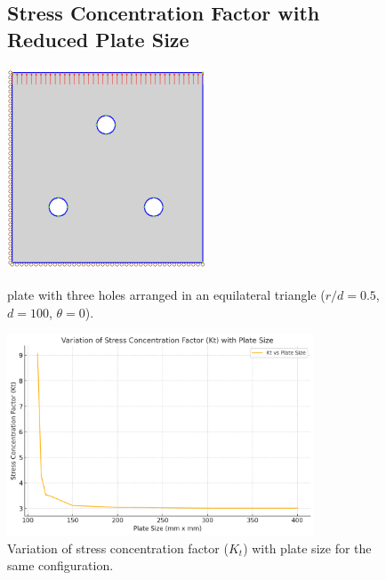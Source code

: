 \documentclass[a4paper,11pt]{article}
\begin{document}
 \begin{figure}[h!]
 \subsection{Stress Concentration Factor with Reduced Plate Size}

    \centering
    \begin{minipage}{0.48\textwidth}
        \centering
        \includegraphics[height=6cm, keepaspectratio]{simulation model.png} %
        \caption{ plate with three holes arranged in an equilateral triangle (\(r/d = 0.5\), \(d = 100\), \(\theta = 0\)). }
        \label{fig:simulation_model}
    \end{minipage}
    \hfill
    \begin{minipage}{0.48\textwidth}
        \centering
        \includegraphics[height=6cm, keepaspectratio]{Variation of Stress Concentration Factor (Kt) with Plate Size.png} %
        \caption{Variation of stress concentration factor (\(K_t\)) with plate size for the same configuration.}
        \label{fig:plate_size_effect}
    \end{minipage}
\end{figure}
\end{document}
